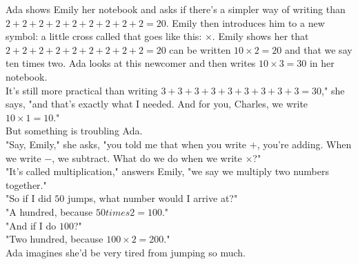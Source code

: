 Ada shows Emily her notebook and asks if there's a simpler way of writing than $2+2+2+2+2+2+2+2+2=20$. Emily then introduces him to a new symbol: a little cross called  that goes like this: $\times$. Emily shows her that $2+2+2+2+2+2+2+2+2=20$ can be written $10 \times 2 = 20$ and that we say ten times two.
Ada looks at this newcomer and then writes $10 \times 3 = 30$ in her notebook. 
\\
It's still more practical than writing $3+3+3+3+3+3+3+3+3=30$," she says, "and that's exactly what I needed. And for you, Charles, we write $10 \times 1 = 10$."\\
But something is troubling Ada.\\
"Say, Emily," she asks, "you told me that when you write $+$, you're adding. When we write $-$, we subtract. What do we do when we write $\times$?"\\
"It's called multiplication," answers Emily, "we say we multiply two numbers together."\\
"So if I did $50$ jumps, what number would I arrive at?"\\
"A hundred, because $50 times 2 = 100$."\\
"And if I do $100$?"\\
"Two hundred, because $100 \times 2 = $200."\\
Ada imagines she'd be very tired from jumping so much.
